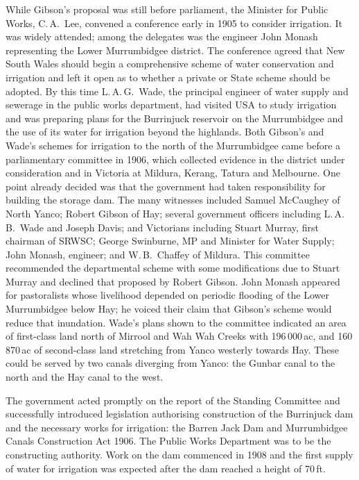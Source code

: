While Gibson's proposal was still before parliament, the Minister for
Public Works, C.\,A.~Lee, convened a conference early in 1905 to
consider irrigation.  It was widely attended; among the delegates was
the engineer John Monash representing the Lower Murrumbidgee district.
The conference agreed that New South Wales should begin a
comprehensive scheme of water conservation and irrigation and left it
open as to whether a private or State scheme should be
adopted.  By this time
L.\,A.\,G.~Wade, the principal engineer of water supply and sewerage
in the public works department, had visited USA to study irrigation
and was preparing plans for the Burrinjuck reservoir on the
Murrumbidgee and the use of its water for irrigation beyond the
highlands.  Both Gibson's and
Wade's schemes for irrigation to the north of the Murrumbidgee came
before a parliamentary committee in 1906, which collected evidence in
the district under consideration and in Victoria at Mildura, Kerang,
Tatura and Melbourne.  One point already decided was that the
government had taken responsibility for building the storage dam.  The
many witnesses included Samuel McCaughey of North Yanco; Robert Gibson
of Hay; several government officers including L.\,A.\,B.~Wade and
Joseph Davis; and Victorians including Stuart Murray, first chairman
of SRWSC; George Swinburne, MP and Minister for Water Supply; John
Monash, engineer; and W.\,B.~Chaffey of Mildura.  This
committee recommended the departmental scheme with some modifications
due to Stuart Murray and declined that proposed by Robert Gibson.
John Monash appeared for pastoralists whose livelihood depended on
periodic flooding of the Lower Murrumbidgee below Hay; he voiced their
claim that Gibson's scheme would reduce that inundation.  Wade's plans
shown to the committee indicated an area of first-class land north of
Mirrool and Wah Wah Creeks with 196\,000\,ac, and 160\,870\,ac of
second-class land stretching from Yanco westerly towards Hay. These
could be served by two canals diverging from Yanco: the Gunbar canal
to the north and the Hay canal to the west.

The government acted promptly on the report of the Standing Committee
and successfully introduced legislation authorising construction of
the Burrinjuck dam and the necessary works for irrigation: the Barren
Jack Dam and Murrumbidgee Canals Construction Act 1906.  The Public
Works Department was to be the constructing
authority.  Work on the dam commenced in
1908 and the first supply of water for irrigation was expected after
the dam reached a height of 70\,ft.

